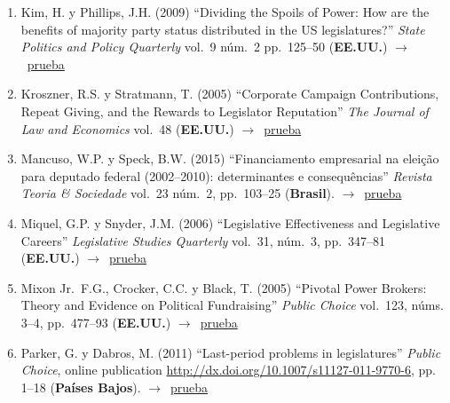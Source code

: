 \documentclass[12 pt, letter]{article}
\newenvironment{CitasMiTrabajo}{
    \begin{footnotesize}
    \begin{enumerate}[label={\footnotesize\emph{cita~\arabic*}},ref=\arabic*] %
        \setlength{\itemsep}{.1\itemsep}
        \setlength{\parskip}{.1\parskip}
    }{\end{enumerate}\end{footnotesize}}
\begin{document}
\begin{CitasMiTrabajo}
       \item Kim, H. y Phillips, J.H. (2009) ``Dividing the Spoils of Power: How are the benefits of majority party status distributed in the US legislatures?'' \emph{State Politics and Policy Quarterly} vol.\ 9 n\'um.\ 2 pp.\ 125--50 (\textbf{EE.UU.}) $\rightarrow$~\href{https://github.com/emagar/cv/blob/master/citasMiTrab/coxMagar/kim+philips.pdf}{prueba}

        \item Kroszner, R.S. y Stratmann, T. (2005)
        ``Corporate Campaign Contributions, Repeat Giving, and the Rewards to
        Legislator Reputation''
        \emph{The Journal of Law and Economics} vol.\ 48 (\textbf{EE.UU.}) $\rightarrow$~\href{https://github.com/emagar/cv/blob/master/citasMiTrab/coxMagar/kros.pdf}{prueba}

        \item Mancuso, W.P. y Speck, B.W. (2015)
        ``Financiamento empresarial na elei{\c c}\~ao para deputado federal (2002--2010): determinantes e consequ\^encias''
        \emph{Revista Teoria \& Sociedade} vol.\ 23 n\'um.\ 2, pp.\ 103--25 (\textbf{Brasil}). $\rightarrow$~\href{https://github.com/emagar/cv/blob/master/citasMiTrab/coxMagar/mancuso2015financiamento.pdf}{prueba}

        \item Miquel, G.P. y Snyder, J.M. (2006)
        ``Legislative Effectiveness and Legislative Careers'' \emph{Legislative Studies
        Quarterly} vol.\ 31, n\'um.\ 3, pp.\ 347--81 (\textbf{EE.UU.}) $\rightarrow$~\href{https://github.com/emagar/cv/blob/master/citasMiTrab/coxMagar/padro.pdf}{prueba}

        \item Mixon Jr.\, F.G., Crocker, C.C. y Black, T. (2005)
        ``Pivotal Power Brokers:
        Theory and Evidence on Political Fundraising'' \emph{Public Choice} vol.\ 123,
        n\'ums. 3--4, pp.\ 477--93  (\textbf{EE.UU.}) $\rightarrow$~\href{https://github.com/emagar/cv/blob/master/citasMiTrab/coxMagar/mixon.pdf}{prueba}

       \item Parker, G. y Dabros, M. (2011) ``Last-period problems in legislatures'' \emph{Public Choice}, online publication \url{http://dx.doi.org/10.1007/s11127-011-9770-6}, pp. 1--18 (\textbf{Pa\'ises Bajos}). $\rightarrow$~\href{https://github.com/emagar/cv/blob/master/citasMiTrab/coxMagar/parker+dabros2011pubcho.excerpt.pdf}{prueba}


\end{CitasMiTrabajo}
\end{document}
